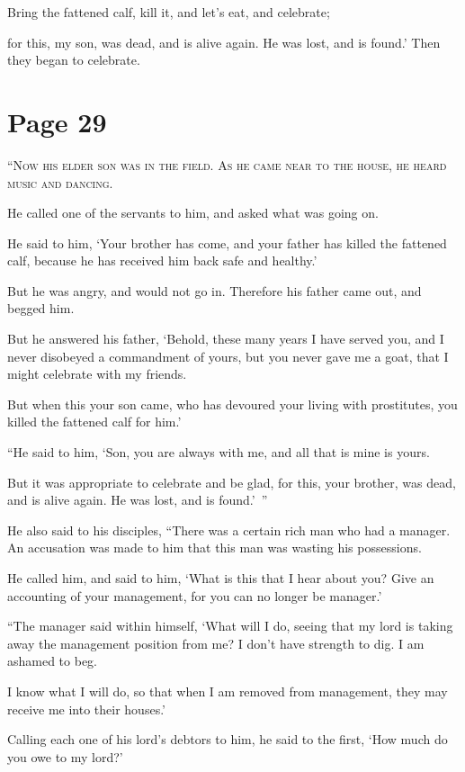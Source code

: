 Bring the fattened calf, kill it, and let’s eat, and celebrate;

for this, my son, was dead, and is alive again. He was lost, and is found.’ Then they began to celebrate.



\chapterornament
\section*{Page 29}

\lettrine{“}{Now his elder son was in the field. As he came near to the house, he heard music and dancing.}

He called one of the servants to him, and asked what was going on.

He said to him, ‘Your brother has come, and your father has killed the fattened calf, because he has received him back safe and healthy.’

But he was angry, and would not go in. Therefore his father came out, and begged him.

But he answered his father, ‘Behold, these many years I have served you, and I never disobeyed a commandment of yours, but you never gave me a goat, that I might celebrate with my friends.

But when this your son came, who has devoured your living with prostitutes, you killed the fattened calf for him.’

“He said to him, ‘Son, you are always with me, and all that is mine is yours.

But it was appropriate to celebrate and be glad, for this, your brother, was dead, and is alive again. He was lost, and is found.’ ”

He also said to his disciples, “There was a certain rich man who had a manager. An accusation was made to him that this man was wasting his possessions.

He called him, and said to him, ‘What is this that I hear about you? Give an accounting of your management, for you can no longer be manager.’

“The manager said within himself, ‘What will I do, seeing that my lord is taking away the management position from me? I don’t have strength to dig. I am ashamed to beg.

I know what I will do, so that when I am removed from management, they may receive me into their houses.’

Calling each one of his lord’s debtors to him, he said to the first, ‘How much do you owe to my lord?’

